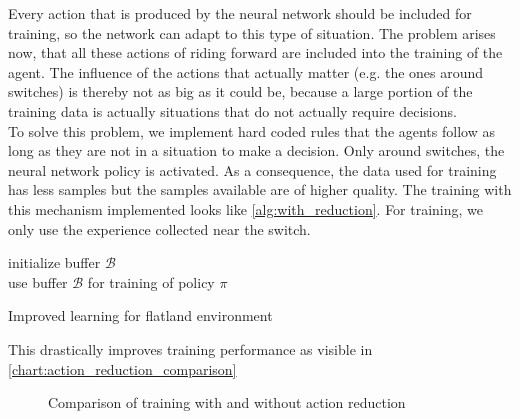 Every action that is produced by the neural network should be included for training, so the network can adapt to this type of situation. The problem arises now, that all these actions of riding forward are included into the training of the agent. The influence of the actions that actually matter (e.g. the ones around switches) is thereby not as big as it could be, because a large portion of the training data is actually situations that do not actually require decisions.\\
To solve this problem, we implement hard coded rules that the agents follow as long as they are not in a situation to make a decision. Only around switches, the neural network policy is activated. As a consequence, the data used for training has less samples but the samples available are of higher quality. The training with this mechanism implemented looks like \autoref{alg:with_reduction}.
For training, we only use the experience collected near the switch.\\
\begin{algorithm}[H]
	initialize buffer $\mathcal{B}$\\
	use buffer $\mathcal{B}$ for training of policy $\pi$

	\caption{Improved learning for flatland environment}
	\label{alg:with_reduction}
\end{algorithm}
This drastically improves training performance as visible in \autoref{chart:action_reduction_comparison}
\begin{figure}[H]
	\begin{center}
		
	\end{center}
	\caption{Comparison of training with and without action reduction}
	\label{chart:action_reduction_comparison}
\end{figure}

